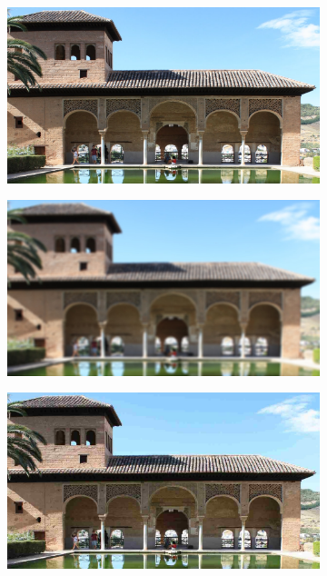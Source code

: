 \begin{figure}
     \centering
     \begin{subfigure}[b]{0.24\textwidth}
         \centering
         \includegraphics[width=\textwidth]{./figs/org009}
     \end{subfigure}
     \hfill
     \begin{subfigure}[b]{0.24\textwidth}
         \centering
         \includegraphics[width=\textwidth]{./figs/blur3}
     \end{subfigure}
     \hfill
     \begin{subfigure}[b]{0.24\textwidth}
         \centering
         \includegraphics[width= \textwidth]{./figs/jpeg3}

\end{subfigure}
\end{figure}

